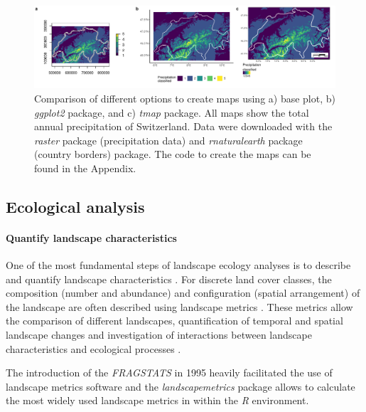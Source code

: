 \documentclass[smallextended]{svjour3}       %
\begin{document}
\begin{figure}
\includegraphics[width=\linewidth]{data/Figure_2} \caption{Comparison of different options to create maps using a) base plot, b) \emph{ggplot2} package, and c) \emph{tmap} package. All maps show the total annual precipitation of Switzerland. Data were downloaded with the \emph{raster} package (precipitation data) and \emph{rnaturalearth} package (country borders) package. The code to create the maps can be found in the Appendix.}\label{fig:fig-map}
\end{figure}

\FloatBarrier

\hypertarget{sec:ecological_analysis}{%
\subsection{Ecological analysis}\label{sec:ecological_analysis}}

\hypertarget{sec:landscape_metrics}{%
\paragraph{Quantify landscape characteristics}\label{sec:landscape_metrics}}

One of the most fundamental steps of landscape ecology analyses is to describe and quantify landscape characteristics \cite{Turner2005,Lausch2015}.
For discrete land cover classes, the composition (number and abundance) and configuration (spatial arrangement) of the landscape are often described using landscape metrics \cite{Gustafson1998,Uuemaa2009,Uuemaa2013,Gustafson2019}.
These metrics allow the comparison of different landscapes, quantification of temporal and spatial landscape changes and investigation of interactions between landscape characteristics and ecological processes \cite{Uuemaa2009}.

The introduction of the \emph{FRAGSTATS} in 1995 heavily facilitated the use of landscape metrics software \cite{McGarigal2012,Kupfer2012,Gustafson2019} and the \emph{landscapemetrics} package \cite{Hesselbarth2019} allows to calculate the most widely used landscape metrics in within the \emph{R} environment.
\end{document}
